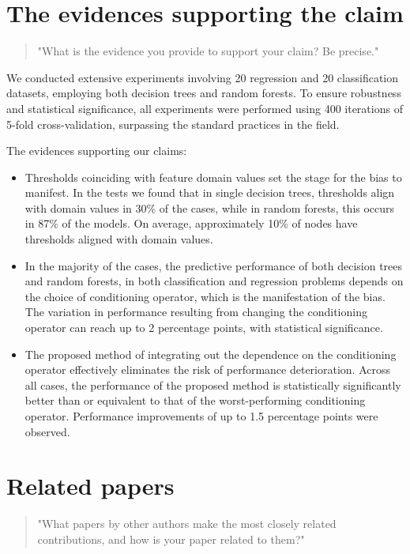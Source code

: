 \documentclass{article}
\begin{document}
\section{The evidences supporting the claim}

\begin{quote}
    "What is the evidence you provide to support your claim? Be precise."
\end{quote}

We conducted extensive experiments involving 20 regression and 20 classification datasets, employing both decision trees and random forests. To ensure robustness and statistical significance, all experiments were performed using 400 iterations of 5-fold cross-validation, surpassing the standard practices in the field.

The evidences supporting our claims:
\begin{itemize}
\item Thresholds coinciding with feature domain values set the stage for the bias to manifest. In the tests we found that in single decision trees, thresholds align with domain values in 30\% of the cases, while in random forests, this occurs in 87\% of the models. On average, approximately 10\% of nodes have thresholds aligned with domain values.
\item In the majority of the cases, the predictive performance of both decision trees and random forests, in both classification and regression problems depends on the choice of conditioning operator, which is the manifestation of the bias. The variation in performance resulting from changing the conditioning operator can reach up to 2 percentage points, with statistical significance.
\item The proposed method of integrating out the dependence on the conditioning operator effectively eliminates the risk of performance deterioration. Across all cases, the performance of the proposed method is statistically significantly better than or equivalent to that of the worst-performing conditioning operator. Performance improvements of up to 1.5 percentage points were observed.
\end{itemize}

\section{Related papers}

\begin{quote}
    "What papers by other authors make the most closely related contributions, and how is your paper related to them?"
\end{quote}
\end{document}
